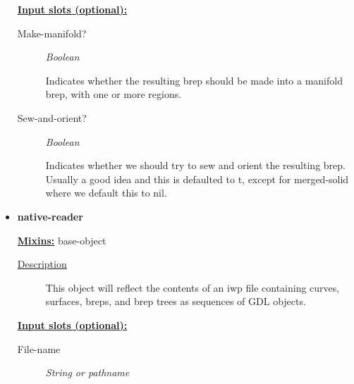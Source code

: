 \documentclass [11pt]{book}
\begin{document}
\begin{itemize}
\begin{description}
\end{description}








\textbf{
\underline{Input slots (optional):}}

\begin{description}

\item [Make-manifold?]
\emph{Boolean}

 Indicates whether the resulting brep should be made into a manifold brep, with one or more regions.




\item [Sew-and-orient?]
\emph{Boolean}

 Indicates whether we should try to sew and orient the resulting brep. Usually a good idea
and this is defaulted to t, except for merged-solid where we default this to nil.




\end{description}







\item {}
\label{prim:native-reader}
\textbf{native-reader}


\textbf{
\underline{Mixins:}} base-object





\begin{description}

\item [
\underline{Description}]


This object will reflect the contents of an iwp file containing
curves, surfaces, breps, and brep trees as sequences of GDL objects. 




\end{description}








\textbf{
\underline{Input slots (optional):}}

\begin{description}

\item [File-name]
\emph{String or pathname}


\end{description}
\end{itemize}
\end{document}
